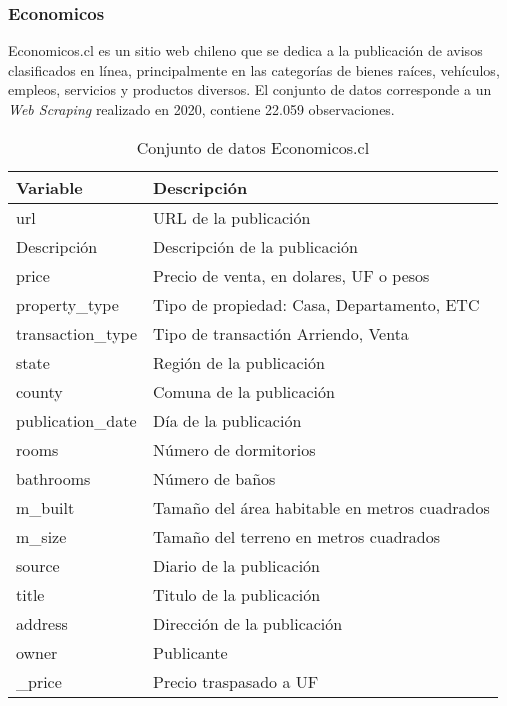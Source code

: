 \subsubsection{Economicos}
Economicos.cl es un sitio web chileno que se dedica a la publicación de avisos clasificados en línea, principalmente en las categorías de bienes raíces, vehículos, empleos, servicios y productos diversos.
El conjunto de datos corresponde a un \emph{Web Scraping} realizado en 2020, contiene 22.059 observaciones.

\begin{table}[H]
	\centering
	\caption{Conjunto de datos Economicos.cl}
	\label{data-economicos}
    \begin{tabular}{|l|m{30em}|}
        \hline
        \rowcolor[gray]{0.8}
        Variable & Descripción \\
        \hline
        url & URL de la publicación \\
        \hline
        Descripción & Descripción de la publicación \\
        \hline
        price & Precio de venta, en dolares, UF o pesos \\
        \hline
        property\_type & Tipo de propiedad: Casa, Departamento, ETC \\
        \hline
        transaction\_type & Tipo de transactión\: Arriendo, Venta \\
        \hline
        state & Región de la publicación \\
        \hline
        county & Comuna de la publicación \\
        \hline
        publication\_date & Día de la publicación \\
        \hline
        rooms & Número de dormitorios \\
        \hline
        bathrooms & Número de baños \\
        \hline
        m\_built & Tamaño del área habitable en metros cuadrados \\
        \hline
        m\_size & Tamaño del terreno en metros cuadrados \\
        \hline
        source & Diario de la publicación \\
        \hline
        title & Titulo de la publicación \\
        \hline
        address & Dirección de la publicación \\
        \hline
        owner & Publicante \\
        \hline
        \_price & Precio traspasado a UF \\
        \hline
    \end{tabular}
\end{table}  



